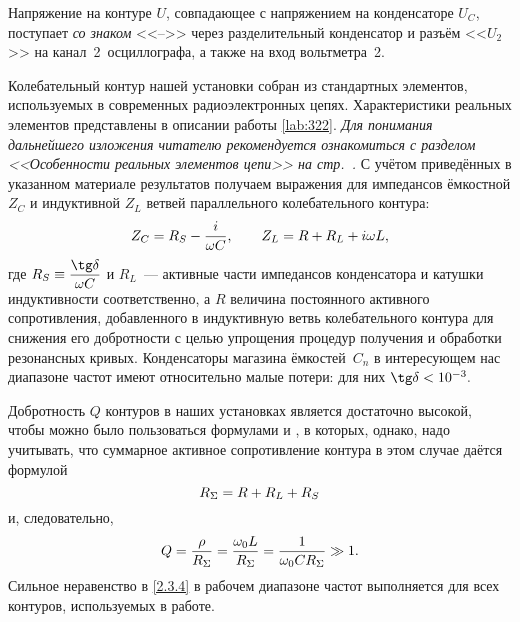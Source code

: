 Напряжение на контуре $U$, совпадающее с напряжением на конденсаторе $U_C$,
поступает \emph{со знаком} <<$–$>> через разделительный конденсатор и разъём
<<${U}_2$>> на канал~2~осциллографа, а также на вход вольтметра~2.


Колебательный контур нашей установки собран из стандартных элементов,
используемых в современных радиоэлектронных цепях. Характеристики реальных элементов
представлены в описании работы \ref{lab:322}. \emph{Для понимания дальнейшего
изложения читателю рекомендуется ознакомиться с разделом
<<Особенности реальных элементов цепи>> на стр.~\pageref{par:real_elements}.} 
С учётом приведённых в указанном материале результатов получаем выражения
для импедансов ёмкостной $Z_C$ и индуктивной $Z_L$ ветвей параллельного 
колебательного контура:
\begin{equation}\eqmark{2.3.2}
	Z_C=R_S-\dfrac{i}{\omega C}, \qquad Z_L=R+R_L+i\omega L,
\end{equation}
где $R_S\equiv\dfrac{\tg\delta}{\omega C}$ и $R_L$~--- активные части
импедансов конденсатора и катушки индуктивности соответственно, а $R$  величина
постоянного активного сопротивления, добавленного в индуктивную ветвь
колебательного контура для снижения его добротности с целью упрощения  процедур
получения и обработки резонансных кривых. 
Конденсаторы магазина ёмкостей~$C_n$ в интересующем нас диапазоне
частот имеют относительно малые потери: для них $\tg\delta<10^{-3}.$

Добротность $Q$ контуров в наших установках является достаточно высокой, чтобы
можно было пользоваться формулами  и , в
которых, однако, надо учитывать, что суммарное активное сопротивление контура в
этом случае даётся формулой
\begin{equation}\eqmark{2.3.3}
	R_{\Sigma}=R+R_L+R_S
\end{equation}
и, следовательно,
\begin{equation}\eqmark{2.3.4}
	Q=\frac{\rho}{R_{\Sigma}}=
    \frac{\omega_0 L}{R_{\Sigma}}=
    \frac{1}{\omega_0 CR_{\Sigma}} \gg 1.
\end{equation}
Сильное неравенство в \eqref{2.3.4} в рабочем диапазоне частот выполняется для
всех контуров, используемых в работе.

